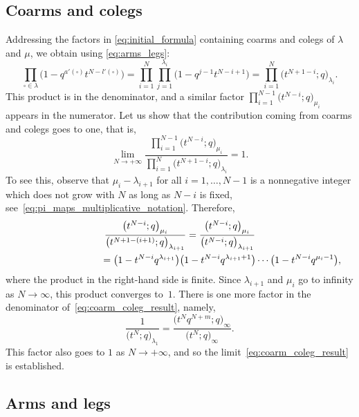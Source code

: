 \subsection{Coarms and colegs}
Addressing the factors in
\eqref{eq:initial_formula}
containing coarms and colegs of $\lambda$ and $\mu$,
we obtain using \eqref{eq:arms_legs}:
\begin{equation*}
	\prod_{\square\in \lambda}\big(1-q^{a'(\square)}t^{N-l'(\square)}\big)
	=
	\prod_{i=1}^{N}
	\prod_{j=1}^{\lambda_i}
	\big(1-q^{j-1}t^{N-i+1}\big)
	=
	\prod_{i=1}^{N}
	\big(t^{N+1-i};q\big)_{\lambda_i}.
\end{equation*}
This product is in the denominator, and a similar
factor
$\prod_{i=1}^{N-1}
\big(t^{N-i};q\big)_{\mu_i}$
appears in the numerator.
Let us show that the contribution coming from
coarms and colegs goes to one, that is,%
\begin{equation}
	\label{eq:coarm_coleg_result}
	\lim_{N\to+\infty}
	\frac{\prod_{i=1}^{N-1}
	\big(t^{N-i};q\big)_{\mu_i}}
	{\prod_{i=1}^{N}
	\big(t^{N+1-i};q\big)_{\lambda_i}}=1.
\end{equation}
To see this, observe that
$\mu_{i}-\lambda_{i+1}$ for all $i=1,\dots,N-1 $ is a nonnegative integer
which does not grow with $N$ as long as $N-i$ is fixed,
see~\eqref{eq:pi_maps_multiplicative_notation}. Therefore,
\begin{gather*}
	\frac{\big(t^{N-i};q\big)_{\mu_i}}{\big(t^{N+1-(i+1)};q\big)_{\lambda_{i+1}}}=
	\frac{\big(t^{N-i};q\big)_{\mu_i}}{\big(t^{N-i};q\big)_{\lambda_{i+1}}}\\
\hphantom{\frac{\big(t^{N-i};q\big)_{\mu_i}}{\big(t^{N+1-(i+1)};q\big)_{\lambda_{i+1}}}}{}
=
	\big(1-t^{N-i}q^{\lambda_{i+1}}\big)\big(1-t^{N-i}q^{\lambda_{i+1}+1}\big)\cdots\big(1-t^{N-i}q^{\mu_i-1}\big) ,
\end{gather*}
where the product in the right-hand side is finite. Since $\lambda_{i+1}$ and $\mu_i$ go to infinity
as $N\to\infty$, this product converges to~$1$.
There is one more factor in the denominator of~\eqref{eq:coarm_coleg_result},
namely,
\begin{equation*}
	\frac{1}{\big(t^N;q\big)_{\lambda_1}}=
	\frac{\big(t^Nq^{N+m};q\big)_\infty}{\big(t^N;q\big)_\infty}.
\end{equation*}
This factor also goes to $1$ as $N\to+\infty$,
and so the limit~\eqref{eq:coarm_coleg_result} is established.

\subsection{Arms and legs}

